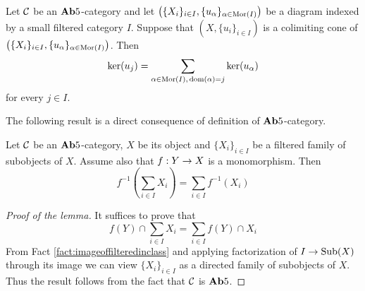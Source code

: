 \begin{theorem}\label{theorem:kernelofastructuremapinab5}
Let ${\mathcal C}$ be an $\mathbf{Ab}5$-category and let $\left(\{X_i\}_{i\in I},\{u_{\alpha}\}_{\alpha \in \mathrm{Mor}(I)}\right)$ be a diagram indexed by a small filtered category $I$. Suppose that $\left(X,\{u_i\}_{i\in I}\right)$ is a colimiting cone of $\left(\{X_i\}_{i\in I},\{u_{\alpha}\}_{\alpha \in \mathrm{Mor}(I)}\right)$. Then
$$\ker(u_j) = \sum_{\alpha \in \mathrm{Mor}(I),\,\mathrm{dom}(\alpha) = j}\ker(u_{\alpha})$$
for every $j\in I$.
\end{theorem}
\noindent
The following result is a direct consequence of definition of $\mathbf{Ab}5$-category.

\begin{lemma}\label{lemma:ab5refinement}
Let ${\mathcal C}$ be an $\mathbf{Ab}5$-category, $X$ be its object and $\{X_i\}_{i\in I}$ be a filtered family of subobjects of $X$. Assume also that $f:Y\rightarrow X$ is a monomorphism. Then
$$f^{-1}\left(\sum_{i\in I}X_i\right) = \sum_{i\in I}f^{-1}(X_i)$$
\end{lemma}
\begin{proof}[Proof of the lemma]
It suffices to prove that 
$$f(Y)\cap \sum_{i\in I}X_i = \sum_{i\in I}f(Y)\cap X_i$$
From Fact \ref{fact:imageoffilteredinclass} and applying factorization of $I\rightarrow \mathrm{Sub}(X)$ through its image we can view $\{X_i\}_{i\in I}$ as a directed family of subobjects of $X$. Thus the result follows from the fact that ${\mathcal C}$ is $\mathbf{Ab}5$.
\end{proof}

